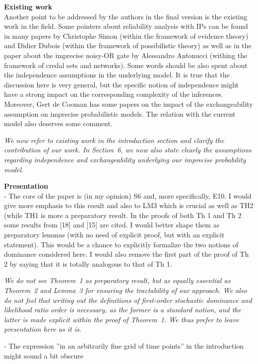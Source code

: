\documentclass[12pt, a4paper]{elsarticle}
\begin{document}
\textbf{Existing work}\\
Another point to be addressed by the authors in the final version is the existing work in the field. Some pointers about reliability analysis with IPs can be found in many papers by Christophe Simon (within the framework of evidence theory) and Didier Dubois (within the framework of possibilistic theory) as well as in the paper about the imprecise noisy-OR gate by Alessandro Antonucci (withing the framework of credal sets and networks). Some words should be also spent about the independence assumptions in the underlying model. It is true that the discussion here is very general, but the specific notion of independence might have a strong impact on the corresponding complexity of the inferences. Moreover, Gert de Cooman has some papers on the impact of the exchangeability assumption on imprecise probabilistic models. The relation with the current model also deserves some comment.

\medskip
\emph{We now refer to existing work in the introduction section and clarify the contribution of our work.
In Section~6, we now also state clearly the assumptions regarding independence and exchangeability
underlying our imprecise probability model.}
\medskip

\textbf{Presentation}\\
- The core of the paper is (in my opinion) S6 and, more specifically, E10. I would give more emphasis to this result and also to LM3 which is crucial as well as TH2 (while TH1 is more a preparatory result. In the proofs of both Th 1 and Th 2 some results from [18] and [15] are cited. I would better shape them as preparatory lemmas (with no need of explicit proof, but with an explicit statement). This would be a chance to explicitly formalize the two notions of dominance considered here. I would also remove the first part of the proof of Th 2 by saying that it is totally analogous to that of Th 1.

\medskip
\emph{We do not see Theorem~1 as preparatory result, but as equally essential as Theorem~2 and Lemma~3
for ensuring the tractability of our approach.
We also do not feel that writing out the definitions of first-order stochastic dominance and likelihood ratio order is necessary,
as the former is a standard notion, and the latter is made explicit within the proof of Theorem~1.
We thus prefer to leave presentation here as it is.}
\medskip

- The expression ''in an arbitrarily fine grid of time points'' in the introduction might sound a bit obscure
\end{document}
